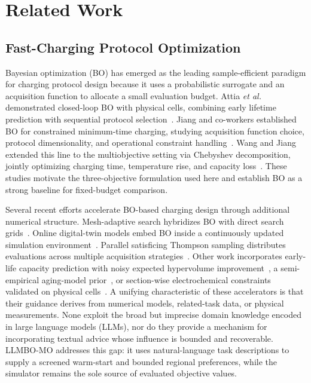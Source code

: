 \section{Related Work}
\label{sec:related_work}

\subsection{Fast-Charging Protocol Optimization}

Bayesian optimization (BO) has emerged as the leading sample-efficient paradigm
for charging protocol design because it uses a probabilistic surrogate and an
acquisition function to allocate a small evaluation budget.
Attia \textit{et al.} demonstrated closed-loop BO with physical cells, combining
early lifetime prediction with sequential protocol selection~\cite{ref11}.
Jiang and co-workers established BO for constrained minimum-time charging,
studying acquisition function choice, protocol dimensionality, and operational
constraint handling~\cite{ref12,ref14}.
Wang and Jiang extended this line to the multiobjective setting via Chebyshev
decomposition, jointly optimizing charging time, temperature rise, and capacity
loss~\cite{ref13}.
These studies motivate the three-objective formulation used here and establish
BO as a strong baseline for fixed-budget comparison.

Several recent efforts accelerate BO-based charging design through additional
numerical structure.
Mesh-adaptive search hybridizes BO with direct search grids~\cite{refDong}.
Online digital-twin models embed BO inside a continuously updated simulation
environment~\cite{refDigitalTwin}.
Parallel satisficing Thompson sampling distributes evaluations across multiple
acquisition strategies~\cite{refBLASTS}.
Other work incorporates early-life capacity prediction with noisy expected
hypervolume improvement~\cite{refZhu}, a semi-empirical aging-model
prior~\cite{refPrBO}, or section-wise electrochemical constraints validated on
physical cells~\cite{refYoon}.
A unifying characteristic of these accelerators is that their guidance derives
from numerical models, related-task data, or physical measurements.
None exploit the broad but imprecise domain knowledge encoded in large language
models (LLMs), nor do they provide a mechanism for incorporating textual advice
whose influence is bounded and recoverable.
LLMBO-MO addresses this gap: it uses natural-language task descriptions to
supply a screened warm-start and bounded regional preferences, while the
simulator remains the sole source of evaluated objective values.


